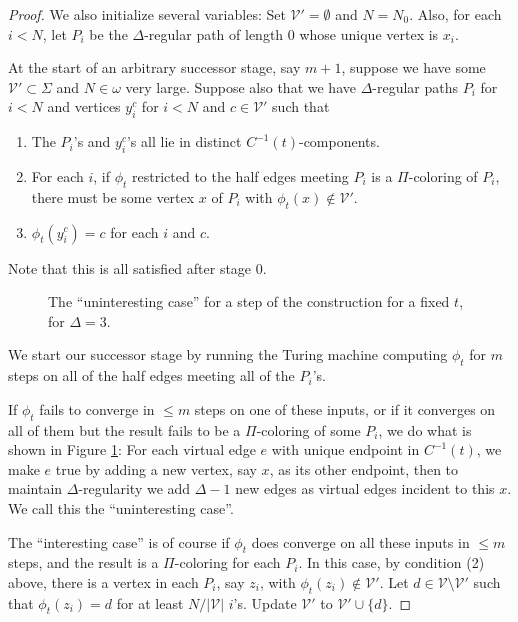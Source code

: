 \documentclass[10pt,a4paper]{amsart}
\newcommand{\inv}{^{-1}}
\begin{document}
\begin{proof}
We also initialize several variables: Set $\mathcal{V}' = \emptyset$ and $N = N_0$. Also, for each $i < N$, let $P_i$ be the $\Delta$-regular path of length 0 whose unique vertex is $x_i$.

At the start of an arbitrary successor stage, say $m+1$, suppose we have some $\mathcal{V}' \subset \Sigma$ and $N \in \omega$ very large. Suppose also that we have $\Delta$-regular paths $P_i$ for $i < N$ and vertices $y_i^c$ for $i < N$ and $c \in \mathcal{V}'$ such that
\begin{enumerate}
    \item The $P_i$'s and $y_i^c$'s all lie in distinct $C\inv(t)$-components.
    \item For each $i$, if $\phi_t$ restricted to the half edges meeting $P_i$ is a $\Pi$-coloring of $P_i$, there must be some vertex $x$ of $P_i$ with $\phi_t(x) \not\in \mathcal{V}'$.
    \item $\phi_t(y_i^c) = c$ for each $i$ and $c$.
\end{enumerate}
Note that this is all satisfied after stage 0. 

\begin{figure}
    \centering
    
    \caption{The ``uninteresting case'' for a step of the construction for a fixed $t$, for $\Delta = 3$.}
    \label{fig:default}
\end{figure}

We start our successor stage by running the Turing machine computing $\phi_t$ for $m$ steps on all of the half edges meeting all of the $P_i$'s. 

If $\phi_t$ fails to converge in $\leq m$ steps on one of these inputs, or if it converges on all of them but the result fails to be a $\Pi$-coloring of some $P_i$, we do what is shown in Figure \ref{fig:default}: For each virtual edge $e$ with unique endpoint in $C\inv(t)$, we make $e$ true by adding a new vertex, say $x$, as its other endpoint, then to maintain $\Delta$-regularity we add $\Delta-1$ new edges as virtual edges incident to this $x$. We call this the ``uninteresting case''.

The ``interesting case'' is of course if $\phi_t$ does converge on all these inputs in $\leq m$ steps, and the result is a $\Pi$-coloring for each $P_i$. In this case, by condition (2) above, there is a vertex in each $P_i$, say $z_i$, with $\phi_t(z_i) \not\in \mathcal{V}'$. Let $d \in \mathcal{V} \setminus \mathcal{V}'$ such that $\phi_t(z_i) = d$ for at least $N/|\mathcal{V}|$ $i$'s. Update $\mathcal{V}'$ to $\mathcal{V}' \cup \{d\}$.


\end{proof}
\end{document}
